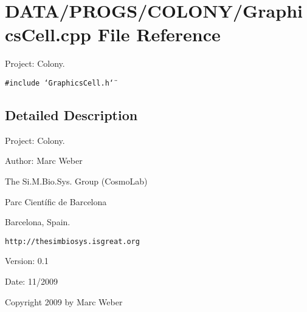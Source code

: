 \section{DATA/PROGS/COLONY/GraphicsCell.cpp File Reference}
\label{GraphicsCell_8cpp}
Project: Colony. 

{\tt \#include \char`\"{}GraphicsCell.h\char`\"{}}\par


\subsection{Detailed Description}
Project: Colony. 

\begin{Desc}
\item[Author:]Marc Weber\par
 The Si.M.Bio.Sys. Group (CosmoLab)\par
 Parc Científic de Barcelona\par
 Barcelona, Spain.\par
 {\tt http://thesimbiosys.isgreat.org} \end{Desc}
\begin{Desc}
\item[Version:]0.1 \end{Desc}
\begin{Desc}
\item[Date:]11/2009\end{Desc}
Copyright 2009 by Marc Weber 